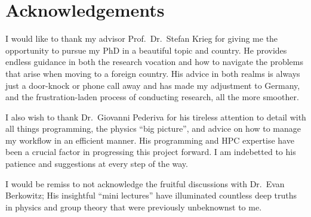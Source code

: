 \chapter*{Acknowledgements}
\label{sec:ack}

I would like to thank my advisor Prof.\ Dr.\ Stefan Krieg for giving me the opportunity to pursue my PhD in a beautiful topic and country. He provides endless guidance in both the research vocation and how to navigate the problems that arise when moving to a foreign country. His advice in both realms is always just a door-knock or phone call away and has made my adjustment to Germany, and the frustration-laden process of conducting research, all the more smoother.       

I also wish to thank Dr.\ Giovanni Pederiva for his tireless attention to detail with all things programming, the physics ``big picture'', and advice on how to manage my workflow in an efficient manner. His programming and HPC expertise have been a crucial factor in progressing this project forward. I am indebetted to his patience and suggestions at every step of the way. 

I would be remiss to not acknowledge the fruitful discussions with Dr.\ Evan Berkowitz; His insightful ``mini lectures'' have illuminated countless deep truths in physics and group theory that were previously unbeknownst to me. 



